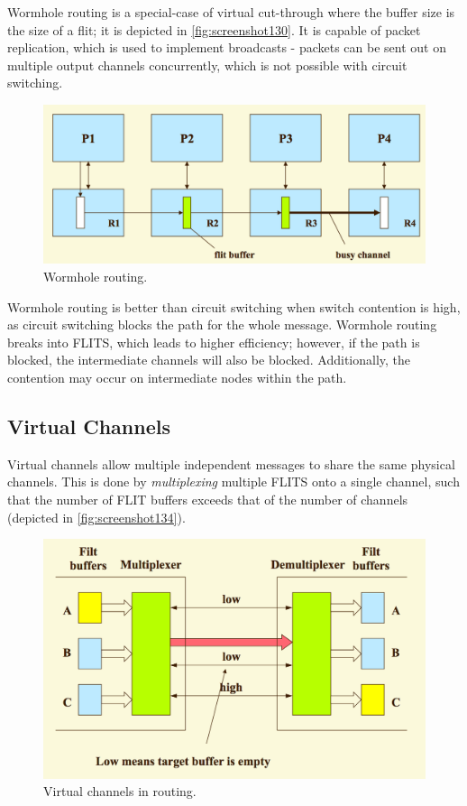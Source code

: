 Wormhole routing is a special-case of virtual cut-through where the buffer size is the size of a flit; it is depicted in \autoref{fig:screenshot130}. It is capable of packet replication, which is used to implement broadcasts - packets can be sent out on multiple output channels concurrently, which is not possible with circuit switching.

\begin{figure}
\centering
\includegraphics[width=0.7\linewidth]{figures/screenshot130}
\caption{Wormhole routing.}
\label{fig:screenshot130}
\end{figure}

Wormhole routing is better than circuit switching when switch contention is high, as circuit switching blocks the path for the whole message. Wormhole routing breaks into FLITS, which leads to higher efficiency; however, if the path is blocked, the intermediate channels will also be blocked. Additionally, the contention may occur on intermediate nodes within the path.

\subsection{Virtual Channels}
Virtual channels allow multiple independent messages to share the same physical channels. This is done by \textit{multiplexing} multiple FLITS onto a single channel, such that the number of FLIT buffers exceeds that of the number of channels (depicted in \autoref{fig:screenshot134}).

\begin{figure}
\centering
\includegraphics[width=0.7\linewidth]{figures/screenshot134}
\caption{Virtual channels in routing.}
\label{fig:screenshot134}
\end{figure}

